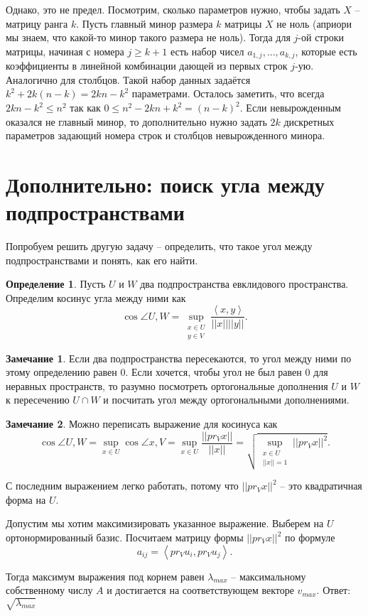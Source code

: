 \documentclass[10pt,a4paper,oneside]{book}
\theoremstyle{definition}
\newtheorem*{rem}{Замечание}
\newtheorem*{defn}{{\color{yellow!30!red} Определение}}
\def\lan{\left\langle }
\def\ran{\right\rangle}
\def\dfn{\begin{defn}}
\def\edfn{\end{defn}}
\def\rm{\begin{rem}}
\def\erm{\end{rem}}
\begin{document}
Однако, это не предел. Посмотрим, сколько параметров нужно, чтобы задать $X$ -- матрицу ранга $k$. Пусть главный минор размера $k$ матрицы $X$ не ноль (априори мы знаем, что какой-то минор такого размера не ноль). Тогда для $j$-ой строки матрицы, начиная с номера $j \geq k+1$ есть набор чисел $a_{1,j},\dots,a_{k,j}$, которые есть коэффициенты в линейной комбинации дающей из первых строк $j$-ую. Аналогично для столбцов. Такой набор данных задаётся $k^2+ 2k(n-k)=2kn-k^2$ параметрами. Осталось заметить, что всегда $2kn - k^2\leq n^2$ так как $0\leq n^2-2kn+k^2=(n-k)^2$. Если невырожденным оказался не главный минор, то дополнительно нужно задать $2k$ дискретных параметров задающий номера строк и столбцов невырожденного минора.



\section*{Дополнительно: поиск угла между подпространствами}
Попробуем решить другую задачу -- определить, что такое угол между подпространствами и понять, как его найти. 

\dfn
Пусть $U$ и $W$ два подпространства  евклидового пространства. Определим косинус угла между ними как 
$$\cos \angle U,W= \sup_{\substack{ x\in U\\ y\in V}} \frac{\lan x,y\ran}{||x|| ||y||}.$$
\edfn

\rm Если два подпространства пересекаются, то угол между ними по этому определению равен 0. Если хочется, чтобы угол не был равен 0 для неравных пространств, то разумно посмотреть ортогональные дополнения $U$ и $W$ к пересечению $U\cap W$ и посчитать угол между ортогональными дополнениями. 
\erm

\rm Можно переписать выражение для косинуса как $$\cos \angle U,W= \sup_{ x\in U} \cos \angle x, V = \sup_{x\in U} \frac{||pr_V x||}{||x||}= \sqrt{ \sup_{\substack{x\in U\\ ||x||=1}} ||pr_V x||^2} .$$
\erm

С последним выражением легко работать, потому что $||pr_V x||^2$ -- это квадратичная форма на $U$.

Допустим мы хотим максимизировать указанное выражение. Выберем на $U$ ортонормированный базис. Посчитаем матрицу формы $||pr_V x||^2$ по формуле 
$$a_{ij}= \lan pr_V u_i, pr_V u_j\ran.$$

Тогда максимум выражения под корнем равен $\lambda_{max}$ -- максимальному собственному числу $A$ и достигается на соответствующем векторе $v_{max}$. Ответ: $\sqrt{\lambda_{max}}$
\end{document}
